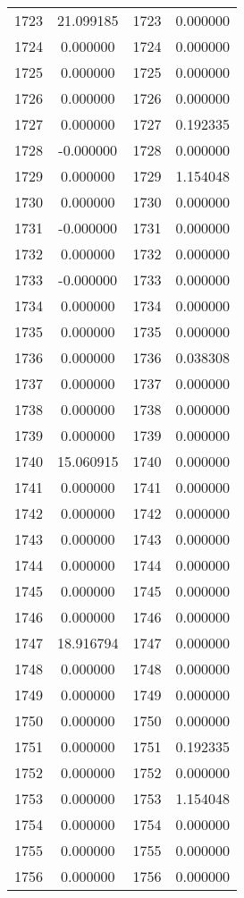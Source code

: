 \documentclass[12pt]{article}
\begin{document}
\begin{longtable}{@{}cccc@{}}
1723 & 21.099185 & 1723 & 0.000000 \\
1724 & 0.000000 & 1724 & 0.000000 \\
1725 & 0.000000 & 1725 & 0.000000 \\
1726 & 0.000000 & 1726 & 0.000000 \\
1727 & 0.000000 & 1727 & 0.192335 \\
1728 & -0.000000 & 1728 & 0.000000 \\
1729 & 0.000000 & 1729 & 1.154048 \\
1730 & 0.000000 & 1730 & 0.000000 \\
1731 & -0.000000 & 1731 & 0.000000 \\
1732 & 0.000000 & 1732 & 0.000000 \\
1733 & -0.000000 & 1733 & 0.000000 \\
1734 & 0.000000 & 1734 & 0.000000 \\
1735 & 0.000000 & 1735 & 0.000000 \\
1736 & 0.000000 & 1736 & 0.038308 \\
1737 & 0.000000 & 1737 & 0.000000 \\
1738 & 0.000000 & 1738 & 0.000000 \\
1739 & 0.000000 & 1739 & 0.000000 \\
1740 & 15.060915 & 1740 & 0.000000 \\
1741 & 0.000000 & 1741 & 0.000000 \\
1742 & 0.000000 & 1742 & 0.000000 \\
1743 & 0.000000 & 1743 & 0.000000 \\
1744 & 0.000000 & 1744 & 0.000000 \\
1745 & 0.000000 & 1745 & 0.000000 \\
1746 & 0.000000 & 1746 & 0.000000 \\
1747 & 18.916794 & 1747 & 0.000000 \\
1748 & 0.000000 & 1748 & 0.000000 \\
1749 & 0.000000 & 1749 & 0.000000 \\
1750 & 0.000000 & 1750 & 0.000000 \\
1751 & 0.000000 & 1751 & 0.192335 \\
1752 & 0.000000 & 1752 & 0.000000 \\
1753 & 0.000000 & 1753 & 1.154048 \\
1754 & 0.000000 & 1754 & 0.000000 \\
1755 & 0.000000 & 1755 & 0.000000 \\
1756 & 0.000000 & 1756 & 0.000000 \\

\end{longtable}
\end{document}
